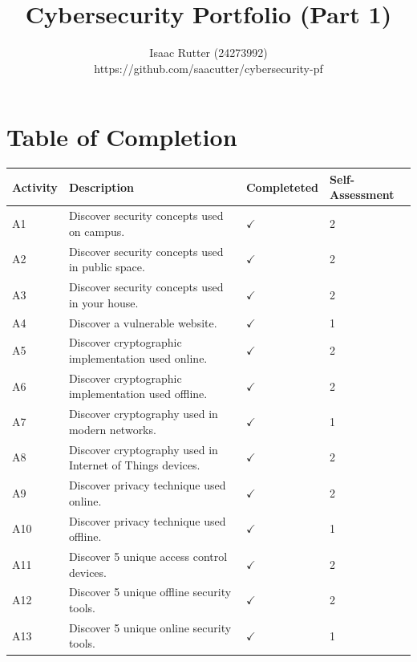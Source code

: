 \documentclass[titlepage]{article}
\title{\textbf{Cybersecurity Portfolio (Part 1)}}
\author{Isaac Rutter (24273992) \\ https://github.com/saacutter/cybersecurity-pf}
\date{}
\begin{document}
    \maketitle

    \newpage

    \centering\section*{Table of Completion}

    \bigskip

    \centering
        \begin{tabular}{ |p{4em}|p{30em}|C{6em}|C{5em}| }
            \hline
            Activity & Description & Completeted & Self-Assessment \\
            \hline
            A1 & Discover security concepts used on campus. & $\checkmark$ & 2 \\
            \hline
            A2 & Discover security concepts used in public space. & $\checkmark$ & 2 \\
            \hline
            A3 & Discover security concepts used in your house. & $\checkmark$ & 2 \\
            \hline
            A4 & Discover a vulnerable website. & $\checkmark$ & 1 \\
            \hline
            A5 & Discover cryptographic implementation used online. &$\checkmark$ & 2 \\
            \hline
            A6 & Discover cryptographic implementation used offline. & $\checkmark$ & 2 \\
            \hline
            A7 & Discover cryptography used in modern networks. & $\checkmark$ & 1 \\
            \hline
            A8 & Discover cryptography used in Internet of Things devices. & $\checkmark$ & 2 \\
            \hline
            A9 & Discover privacy technique used online. & $\checkmark$ & 2 \\
            \hline
            A10 & Discover privacy technique used offline. & $\checkmark$ & 1 \\
            \hline
            A11 & Discover 5 unique access control devices. & $\checkmark$ & 2 \\
            \hline
            A12 & Discover 5 unique offline security tools. & $\checkmark$ & 2 \\
            \hline
            A13 & Discover 5 unique online security tools. & $\checkmark$ & 1 \\

\end{tabular}
\end{document}
